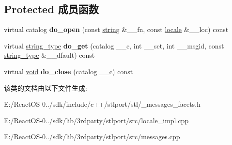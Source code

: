 \subsection*{Protected 成员函数}
\begin{DoxyCompactItemize}
\item 
\mbox{\label{classmessages_3_01char_01_4_a35d99921df11e3c8deb88633f1782a48}} 
virtual catalog {\bfseries do\+\_\+open} (const \hyperlink{structstring}{string} \&\+\_\+\+\_\+fn, const \hyperlink{classlocale}{locale} \&\+\_\+\+\_\+loc) const
\item 
\mbox{\label{classmessages_3_01char_01_4_acbba2fafc506bcebaebb6f7dd7b6e8b5}} 
virtual \hyperlink{structstring}{string\+\_\+type} {\bfseries do\+\_\+get} (catalog \+\_\+\+\_\+c, int \+\_\+\+\_\+set, int \+\_\+\+\_\+msgid, const \hyperlink{structstring}{string\+\_\+type} \&\+\_\+\+\_\+dfault) const
\item 
\mbox{\label{classmessages_3_01char_01_4_a92fbebfaa76c2dccfcf6308d3dc8b92e}} 
virtual \hyperlink{interfacevoid}{void} {\bfseries do\+\_\+close} (catalog \+\_\+\+\_\+c) const
\end{DoxyCompactItemize}


该类的文档由以下文件生成\+:\begin{DoxyCompactItemize}
\item 
E\+:/\+React\+O\+S-\/0../sdk/include/c++/stlport/stl/\+\_\+messages\+\_\+facets.\+h\item 
E\+:/\+React\+O\+S-\/0../sdk/lib/3rdparty/stlport/src/locale\+\_\+impl.\+cpp\item 
E\+:/\+React\+O\+S-\/0../sdk/lib/3rdparty/stlport/src/messages.\+cpp\end{DoxyCompactItemize}
